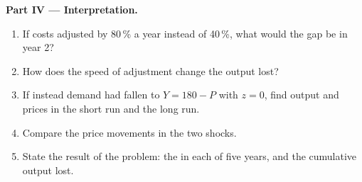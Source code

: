 \begin{problem}
\medskip
\noindent\textbf{Part IV --- Interpretation.}
\begin{enumerate}[resume]
\item If costs adjusted by 80\,\% a year instead of 40\,\%, what would the gap be in year 2?
\item How does the speed of adjustment change the output lost?
\item If instead demand had fallen to $Y = 180 - P$ with $z = 0$, find output and prices in the short run and the long run.
\item Compare the price movements in the two shocks.
\item State the result of the problem: the  in each of five years, and the cumulative output lost.
\end{enumerate}
\end{problem}
